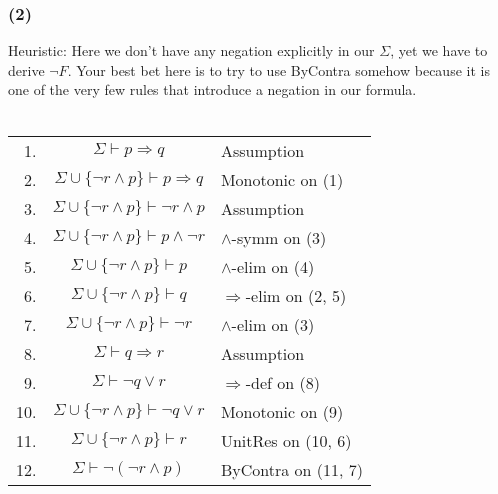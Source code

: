 \documentclass{article}
\begin{document}
\subsubsection*{(2)}
Heuristic: Here we don't have any negation explicitly in our $\Sigma$, yet we have to derive $\lnot F$. Your best bet here is to try to use ByContra somehow because it is one of the very few rules that introduce a negation in our formula.\\
\\
\begin{tabular}{r c l}
    1. & $\Sigma\vdash p\Rightarrow q$ & Assumption\\
    2. & $\Sigma\cup\{\lnot r\wedge p\}\vdash p\Rightarrow q$ & Monotonic on (1)\\
    3. & $\Sigma\cup\{\lnot r\wedge p\}\vdash \lnot r\wedge p$ & Assumption\\
    4. & $\Sigma\cup\{\lnot r\wedge p\}\vdash p\wedge \lnot r$ & $\wedge$-symm on (3)\\
    5. & $\Sigma\cup\{\lnot r\wedge p\}\vdash p$ & $\wedge$-elim on (4)\\
    6. & $\Sigma\cup\{\lnot r\wedge p\}\vdash q$ & $\Rightarrow$-elim on (2, 5)\\
    7. & $\Sigma\cup\{\lnot r\wedge p\}\vdash \lnot r$ & $\wedge$-elim on (3)\\
    8. & $\Sigma\vdash q\Rightarrow r$ & Assumption\\
    9. & $\Sigma\vdash \lnot q\lor r$ & $\Rightarrow$-def on (8)\\
    10. & $\Sigma\cup\{\lnot r\wedge p\}\vdash \lnot q\lor r$ & Monotonic on (9)\\
    11. & $\Sigma\cup\{\lnot r\wedge p\}\vdash r$ & UnitRes on (10, 6)\\
    12. & $\Sigma\vdash\lnot(\lnot r\wedge p)$ & ByContra on (11, 7)
\end{tabular}
\end{document}
